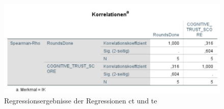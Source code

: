 \documentclass[a4paper,11pt]{article}%
\renewcommand{\\}{\vspace*{0.5\baselineskip} \newline}
\begin{document}
\begin{figure}[H]
\begin{footnotesize}
			\includegraphics[scale=0.6]{Abbildungen/Post_QuestionnaireStatistiks/H3_IK_Korrelation_Spearman}
			\caption{Regressionsergebnisse der Regressionen \ac{ct} und \ac{te} }
			\label{fig:h3_both}
		\end{footnotesize}
	\end{figure}	
	
\end{document}
